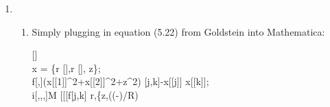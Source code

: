 \documentclass[10pt]{article}
\newcommand{\op}[1]{\pmb{\text{#1}}}
\begin{document}
\begin{enumerate}
\begin{gather*}
      \op{A}^{-1}=
      \left(
      \begin{array}{ccc}
        \cos (\psi ) \cos (\phi )-\cos (\theta ) \sin (\psi ) \sin (\phi ) & -\cos (\theta ) \cos (\psi ) \sin (\phi )-\sin (\psi ) \cos (\phi ) & \sin (\theta ) \sin (\phi ) \\
        \cos (\theta ) \sin (\psi ) \cos (\phi )+\cos (\psi ) \sin (\phi ) & \cos (\theta ) \cos (\psi ) \cos (\phi )-\sin (\psi ) \sin (\phi ) & \sin (\theta ) (-\cos (\phi )) \\
        \sin (\theta ) \sin (\psi )                                        & \sin (\theta ) \cos (\psi )                                         & \cos (\theta )                 \\
      \end{array}
      \right)\\
      \omega_{bf}=
      \begin{pmatrix}
        \theta ' \cos (\psi )+\sin (\theta ) \sin (\psi ) \phi ' \\
        \sin (\theta ) \cos (\psi ) \phi '-\theta ' \sin (\psi ) \\
        \cos (\theta ) \phi '+\psi '
      \end{pmatrix}\\
      \op{A}^{-1}\omega_{bf}=
      \begin{pmatrix}
        \theta ' \cos (\phi )+\sin (\theta ) \psi ' \sin (\phi ) \\
        \theta ' \sin (\phi )-\sin (\theta ) \psi ' \cos (\phi ) \\
        \cos (\theta ) \psi '+\phi '
      \end{pmatrix}
    \end{gather*}
    \item
    \begin{enumerate}
      \item Simply plugging in equation (5.22) from Goldstein into Mathematica:\\
      \linebreak
      \parbox{\textwidth}{
        []\\
        x = \{r [\theta ],r [\theta ], z\};\\
        f[,]\text{:=}(x[[1]]{}^{\wedge}2+x[[2]]{}^{\wedge}2+z{}^{\wedge}2) [j,k]-x[[j]] x[[k]];\\
        i[,,,]\text{:=}M [[[f[j,k] r,\{z,((-)/R)
}
\end{enumerate}
\end{enumerate}
\end{document}

